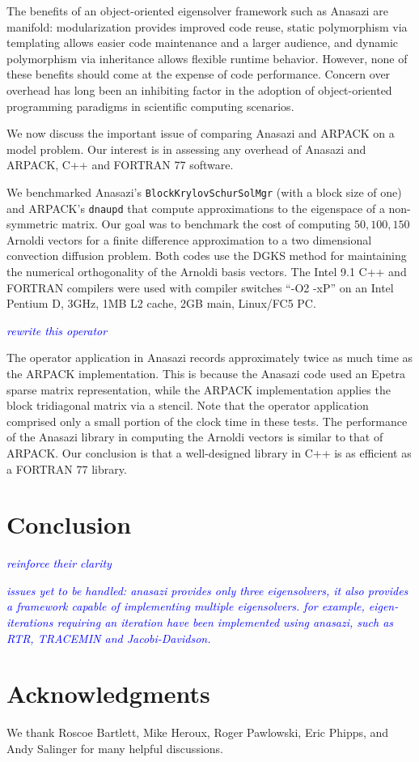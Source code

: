 \documentclass[acmtoms]{acmtrans2m}
\newcommand{\aspace}[1]{\texttt{#1}}
\newcommand{\cbcomm}[1]{\textcolor{blue}{\emph{#1}}}
\begin{document}
The benefits of an object-oriented eigensolver framework such as
Anasazi are manifold: modularization provides improved code reuse,
static polymorphism via templating allows easier code maintenance and
a larger audience, and dynamic polymorphism via inheritance allows
flexible runtime behavior. However, none of these benefits should come
at the expense of code performance. Concern over overhead has long
been an inhibiting factor in the adoption of object-oriented
programming paradigms in scientific computing scenarios. 

We now discuss the important issue of comparing Anasazi and ARPACK
on a model problem. Our interest is in assessing any overhead of
Anasazi and ARPACK, C++ and FORTRAN 77 software.

We benchmarked Anasazi's \aspace{BlockKrylovSchurSolMgr} (with a block size
of one) and ARPACK's \aspace{dnaupd} that compute approximations to the
eigenspace of a non-symmetric matrix. Our goal was to benchmark the
cost of computing $50, 100, 150$ Arnoldi vectors for a finite
difference approximation to a two dimensional convection diffusion
problem. Both codes use the DGKS \cite{dgks:76} method for
maintaining the numerical orthogonality of the Arnoldi basis
vectors.  The Intel 9.1 C++ and FORTRAN compilers were used with
compiler switches ``-O2 -xP'' on an Intel Pentium D, 3GHz, 1MB L2
cache, 2GB main, Linux/FC5 PC.

\cbcomm{rewrite this operator}

The operator application in Anasazi records approximately twice as much time as the ARPACK
implementation. This is because the Anasazi code used an Epetra sparse matrix
representation, while the ARPACK implementation applies the block tridiagonal
matrix via a stencil. Note that the operator application comprised only a small
portion of the clock time in these tests. The performance of the Anasazi library in
computing the Arnoldi vectors is similar to that of ARPACK. Our conclusion is that a
well-designed library in C++ is as efficient as a FORTRAN 77 library.

\section{Conclusion}

\cbcomm{reinforce their clarity}

\cbcomm{issues yet to be handled: anasazi provides only three
eigensolvers, it also provides a framework capable of implementing
multiple eigensolvers. for example, eigen-iterations requiring an
iteration have been implemented using anasazi, such as RTR, TRACEMIN
and Jacobi-Davidson.}

\section{Acknowledgments}
We thank Roscoe Bartlett, Mike Heroux, Roger Pawlowski, Eric Phipps,
and Andy Salinger for many helpful discussions.





\begin{received}
\end{received}
\end{document}
